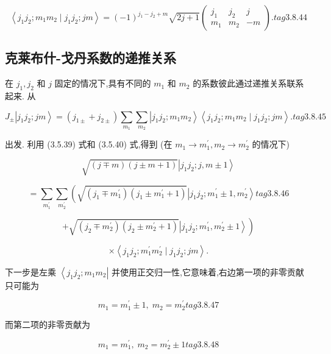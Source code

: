 $$
\left\langle {{j}_{1}{j}_{2};{m}_{1}{m}_{2} \mid {j}_{1}{j}_{2};{jm}}\right\rangle = {\left( -1\right) }^{{j}_{1} - {j}_{2} + m}\sqrt{{2j} + 1}\left( \begin{matrix} {j}_{1} & {j}_{2} & j \\ {m}_{1} & {m}_{2} & - m \end{matrix}\right) . tag{3.8.44}
$$

\subsection{克莱布什-戈丹系数的递推关系}

在 ${j}_{1},{j}_{2}$ 和 $j$ 固定的情况下,具有不同的 ${m}_{1}$ 和 ${m}_{2}$ 的系数彼此通过递推关系联系起来. 从

$$
{J}_{ \pm }\left| {{j}_{1}{j}_{2};{jm}}\right\rangle = \left( {{j}_{1 \pm } + {j}_{2 \pm }}\right) \mathop{\sum }\limits_{{m}_{1}}\mathop{\sum }\limits_{{m}_{2}}\left| {{j}_{1}{j}_{2};{m}_{1}{m}_{2}}\right\rangle \left\langle {{j}_{1}{j}_{2};{m}_{1}{m}_{2} \mid {j}_{1}{j}_{2};{jm}}\right\rangle . tag{3.8.45}
$$

出发. 利用 (3.5.39) 式和 (3.5.40) 式,得到 (在 ${m}_{1} \rightarrow {m}_{1}^{\prime },{m}_{2} \rightarrow {m}_{2}^{\prime }$ 的情况下)

$$
\sqrt{\left( {j \mp m}\right) \left( {j \pm m + 1}\right) }\left| {{j}_{1}{j}_{2};j, m \pm 1}\right\rangle
$$

$$
= \mathop{\sum }\limits_{{m}_{1}^{\prime }}\mathop{\sum }\limits_{{m}_{2}^{\prime }}\left( {\sqrt{\left( {{j}_{1} \mp {m}_{1}^{\prime }}\right) \left( {{j}_{1} \pm {m}_{1}^{\prime } + 1}\right) }\left| {{j}_{1}{j}_{2};{m}_{1}^{\prime } \pm 1,{m}_{2}^{\prime }}\right\rangle }\right. tag{3.8.46}
$$

$$
\left. {+\sqrt{\left( {{j}_{2} \mp {m}_{2}^{\prime }}\right) \left( {{j}_{2} \pm {m}_{2}^{\prime } + 1}\right) }\left| {{j}_{1}{j}_{2};{m}_{1}^{\prime },{m}_{2}^{\prime } \pm 1}\right\rangle }\right)
$$

$$
\times \left\langle {{j}_{1}{j}_{2};{m}_{1}^{\prime }{m}_{2}^{\prime } \mid {j}_{1}{j}_{2};{jm}}\right\rangle .
$$

下一步是左乘 $\left\langle {{j}_{1}{j}_{2};{m}_{1}{m}_{2}}\right|$ 并使用正交归一性,它意味着,右边第一项的非零贡献只可能为

$$
{m}_{1} = {m}_{1}^{\prime } \pm 1,\;{m}_{2} = {m}_{2}^{\prime } tag{3.8.47}
$$

而第二项的非零贡献为

$$
{m}_{1} = {m}_{1}^{\prime },\;{m}_{2} = {m}_{2}^{\prime } \pm 1 tag{3.8.48}
$$

